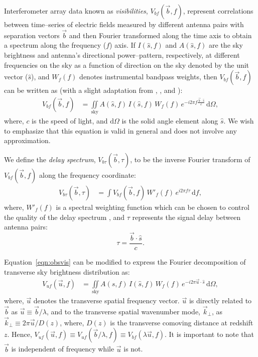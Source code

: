 \documentclass[preprint2,iop,numberedappendix]{emulateapj}
\newcommand{\dif}{\mathrm{d}}
\begin{document}
Interferometer array data known as {\it visibilities}, $V_{bf}(\vec{b},f)$, represent correlations between time--series of electric fields measured by different antenna pairs with separation vectors $\vec{b}$ and then Fourier transformed along the time axis to obtain a spectrum along the frequency ($f$) axis. If $I(\hat{s},f)$ and $A(\hat{s},f)$ are the sky brightness and antenna's directional power--pattern, respectively, at different frequencies on the sky as a function of direction on the sky denoted by the unit vector ($\hat{s}$), and $W_f(f)$ denotes instrumental bandpass weights, then $V_{bf}(\vec{b},f)$ can be written as (with a slight adaptation from \citet{van34}, \citet{zer38}, and \citet{tho01}):
\begin{align}\label{eqn:obsvis}
  V_{bf}(\vec{b},f) &= \iint\limits_\textrm{sky} A(\hat{s},f)\,I(\hat{s},f)\,W_f(f)\,e^{-i2\pi f\frac{\vec{b}\cdot\hat{s}}{c}}\,\dif\Omega,
\end{align}
where, $c$ is the speed of light, and $\dif\Omega$ is the solid angle element along $\hat{s}$. We wish to emphasize that this equation is valid in general and does not involve any approximation.

We define the {\it delay spectrum}, $V_{b\tau}(\vec{b},\tau)$, to be the inverse Fourier transform of $V_{bf}(\vec{b},f)$ along the frequency coordinate:
\begin{align}\label{eqn:delay-transform}
  V_{b\tau}(\vec{b},\tau) &= \int V_{bf}(\vec{b},f)\,W'_f(f)\,e^{i2\pi f\tau}\,\dif f,
\end{align}
where, $W'_f(f)$ is a spectral weighting function which can be chosen to control the quality of the delay spectrum \citep{thy13,ved12}, and $\tau$ represents the signal delay between antenna pairs:
\begin{equation}\label{eqn:delay}
  \tau = \frac{\vec{b}\cdot\hat{s}}{c}.
\end{equation}

Equation~\ref{eqn:obsvis} can be modified to express the Fourier decomposition of transverse sky brightness distribution as:
\begin{align}\label{eqn:vis}
  V_{uf}(\vec{u},f) &= \iint\limits_\textrm{sky} A(\hat{s},f)\,I(\hat{s},f)\,W_f(f)\,e^{-i2\pi\vec{u}\cdot\hat{s}}\,\dif\Omega,
\end{align}
where, $\vec{u}$ denotes the transverse spatial frequency vector. $\vec{u}$ is directly related to $\vec{b}$ as $\vec{u}\equiv \vec{b}/\lambda$, and to the transverse spatial wavenumber mode, $\vec{k}_\perp$, as $\vec{k}_\perp\equiv 2\pi\vec{u}/D(z)$, where, $D(z)$ is the transverse comoving distance at redshift $z$. Hence, $V_{uf}(\vec{u},f)\equiv V_{uf}(\vec{b}/\lambda,f)\equiv V_{bf}(\lambda\vec{u},f)$. It is important to note that $\vec{b}$ is independent of frequency while $\vec{u}$ is not.
\end{document}
